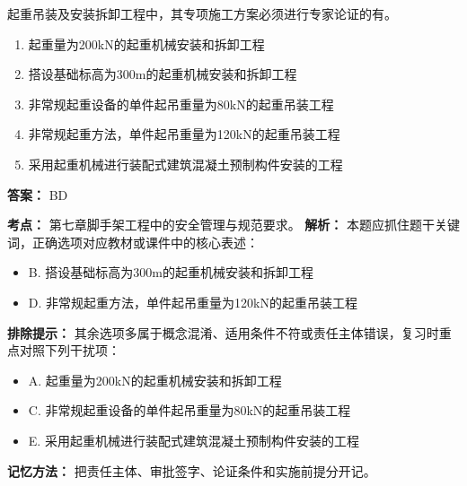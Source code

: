 \documentclass[UTF8,fontset=fandol,11pt]{ctexart}
\begin{document}
\begin{quizbox}[title={第 6 题}]
起重吊装及安装拆卸工程中，其专项施工方案必须进行专家论证的有。\\
\begin{enumerate}[label=\Alph*.]
\item 起重量为200kN的起重机械安装和拆卸工程
\item 搭设基础标高为300m的起重机械安装和拆卸工程
\item 非常规起重设备的单件起吊重量为80kN的起重吊装工程
\item 非常规起重方法，单件起吊重量为120kN的起重吊装工程
\item 采用起重机械进行装配式建筑混凝土预制构件安装的工程
\end{enumerate}
\textbf{答案：} BD
\vspace{0.25em}
\begin{answerbox}[title={考点解析}]
\textbf{考点：} 第七章脚手架工程中的安全管理与规范要求。
\textbf{解析：} 本题应抓住题干关键词，正确选项对应教材或课件中的核心表述：
\begin{itemize}
\item B. 搭设基础标高为300m的起重机械安装和拆卸工程
\item D. 非常规起重方法，单件起吊重量为120kN的起重吊装工程
\end{itemize}
\textbf{排除提示：} 其余选项多属于概念混淆、适用条件不符或责任主体错误，复习时重点对照下列干扰项：
\begin{itemize}
\item A. 起重量为200kN的起重机械安装和拆卸工程
\item C. 非常规起重设备的单件起吊重量为80kN的起重吊装工程
\item E. 采用起重机械进行装配式建筑混凝土预制构件安装的工程
\end{itemize}
\textbf{记忆方法：} 把责任主体、审批签字、论证条件和实施前提分开记。
\end{answerbox}
\end{quizbox}

\vspace{0.2em}
\end{document}
